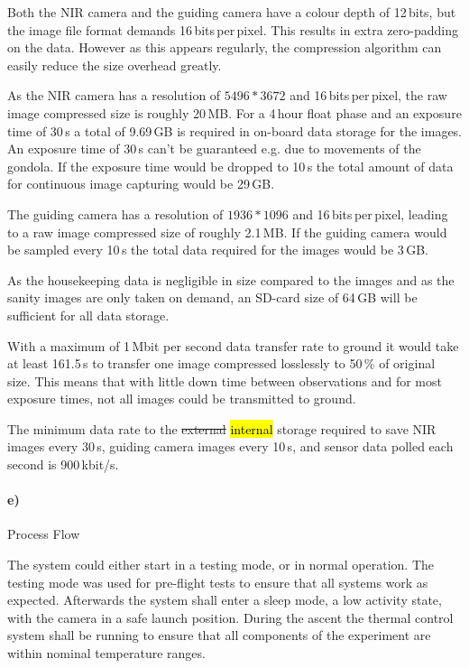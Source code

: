 Both the NIR camera and the guiding camera have a colour depth of 12\,bits, but the image file format demands 16\,bits\,per\,pixel. This results in extra zero-padding on the data. However as this appears regularly, the compression algorithm can easily reduce the size overhead greatly.

As the NIR camera has a resolution of $5496 * 3672$ and 16\,bits\,per\,pixel, the raw image compressed size is roughly 20\,MB. For a 4\,hour float phase and an exposure time of 30\,s a total of  9.69\,GB is required in on-board data storage for the images. An exposure time of 30\,s can't be guaranteed e.g. due to movements of the gondola. If the exposure time would be dropped to 10\,s the total amount of data for continuous image capturing would be 29\,GB.

The guiding camera has a resolution of $1936 * 1096$ and 16\,bits\,per\,pixel, leading to a raw image compressed size of roughly 2.1\,MB. If the guiding camera would be sampled every 10\,s the total data required for the images would be 3\,GB.

As the housekeeping data is negligible in size compared to the images and as the sanity images are only taken on demand, an SD-card size of 64\,GB will be sufficient for all data storage.

With a maximum of 1\,Mbit per second data transfer rate to ground it would take at least 161.5\,s to transfer one image compressed losslessly to 50\,\% of original size. This means that with little down time between observations and for most exposure times, not all images could be transmitted to ground.

The minimum data rate to the \st{external} \hl{internal} storage required to save NIR images every 30\,s, guiding camera images every 10\,s, and sensor data polled each second is 900\,kbit/s.


\paragraph{e)} Process Flow

The system could either start in a testing mode, or in normal operation. The testing mode was used for pre-flight tests to ensure that all systems work as expected. Afterwards the system shall enter a sleep mode, a low activity state, with the camera in a safe launch position. During the ascent the thermal control system shall be running to ensure that all components of the experiment are within nominal temperature ranges.

